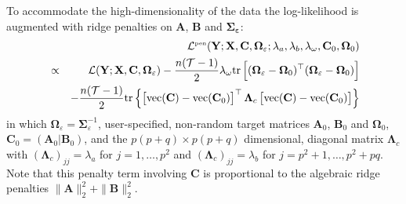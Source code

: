 {To accommodate the high-dimensionality of the data the log-likelihood
is augmented with ridge penalties on $\mathbf{A}$, $\mathbf{B}$ and $\mathbf{\Sigma_{\varepsilon}}$:
\begin{eqnarray*}
& & \hspace{-2cm} \mathcal{L}^{\mbox{{\tiny pen}}}(\mathbf{Y};\mathbf{X},\mathbf{C},\boldsymbol{\Omega}_{\varepsilon};\lambda_a,\lambda_b,\lambda_{\omega},\mathbf{C}_0, \boldsymbol{\Omega}_0)
\\
& \propto & \mathcal{L}(\mathbf{Y};\mathbf{X},\mathbf{C}, \boldsymbol{\Omega}_{\varepsilon}) -\frac{n(\mathcal{T}-1)}{2}\lambda_{\omega}\textrm{tr}\left[(\boldsymbol{\Omega}_{\varepsilon}-\boldsymbol{\Omega}_{0})^\top(\boldsymbol{\Omega}_{\varepsilon}-\boldsymbol{\Omega}_{0})\right]
\\
& & -\frac{n(\mathcal{T}-1)}{2}\textrm{tr}\left\{\left[\textrm{vec}( \mathbf{C})-\textrm{vec}(\mathbf{C}_0) \right]^\top \mathbf{\Lambda}_c \left[\textrm{vec} (\mathbf{C})-\textrm{vec}(\mathbf{C}_0) \right]\right\}
\end{eqnarray*}
in which $\boldsymbol{\Omega}_{\varepsilon} = \boldsymbol{\Sigma}_{\varepsilon}^{-1}$, user-specified, non-random target matrices $\mathbf{A}_0$, $\mathbf{B}_0$ and $\mathbf{\Omega}_0$, $\mathbf{C}_0 = (\mathbf{A}_0 | \mathbf{B}_0)$, and the $p(p+q) \times p(p+q)$ dimensional, diagonal matrix $\mathbf{\Lambda}_c$ with $(\mathbf{\Lambda}_c)_{jj} = \lambda_a$ for $j = 1, \ldots, p^2$ and $(\mathbf{\Lambda}_c)_{jj} = \lambda_b$ for $j = p^2 + 1, \ldots, p^2 + pq$. Note that this penalty term involving $\mathbf{C}$ is proportional to the algebraic ridge penalties $\| \mathbf{A} \|^2_2 + \| \mathbf{B} \|^2_2$.

}
